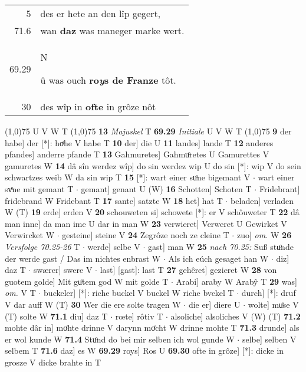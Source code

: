 \documentclass[8pt,a4paper,notitlepage]{article}
\begin{document}
\begin{table}[ht]
\begin{minipage}[t]{0.5\linewidth}
\begin{tabular}{rl}
5 & des er hete an den lîp gegert,\\ 
71.6 & wan \textbf{daz} was maneger marke wert.\\ 
69.29 & \begin{large}N\end{large}û was ouch \textbf{ro\textit{y}s de Franze} tôt.\\ 
30 & des wîp in \textbf{ofte} in grôze nôt\\ 
\end{tabular}
\scriptsize
\line(1,0){75} \newline
U V W T \newline
\line(1,0){75} \newline
\textbf{13} \textit{Majuskel} T  \textbf{69.29} \textit{Initiale} U V W T  \newline
\line(1,0){75} \newline
\textbf{9} der habe] der [*]: hoͤhe V habe T \textbf{10} der] die U \textbf{11} landes] lande T \textbf{12} anderes pfandes] anderre pfande T \textbf{13} Gahmuretes] Gahmuͦretes U Gamurettes V gamuretes W \textbf{14} dâ sîn werdez wîp] do sin werdez wip U do sin [*]: wip V do sein schwartzes weib W da sin wip T \textbf{15} [*]: wart einer suͦne bigemant V  $\cdot$ wart einer svͦne mit gemant T  $\cdot$ gemant] genant U (W) \textbf{16} Schotten] Schoten T  $\cdot$ Fridebrant] fridebrand W Fridebant T \textbf{17} sante] satzte W \textbf{18} het] hat T  $\cdot$ beladen] verladen W (T) \textbf{19} erde] erden V \textbf{20} schouweten si] schowete [*]: er V schôuweter T \textbf{22} dâ man inne] da man ime U dar in man W \textbf{23} verwieret] Verweret U Gewirket V Verwircket W  $\cdot$ gesteine] steine V \textbf{24} Zegrôze noch ze cleine T  $\cdot$ zuo] \textit{om.} W \textbf{26} \textit{Versfolge 70.25-26} T   $\cdot$ werde] selbe V  $\cdot$ gast] man W \textbf{25} \textit{nach 70.25:} Suß stuͦnde der werde gast / Das im nichtes enbrast W   $\cdot$ Als ich eúch gesaget han W  $\cdot$ diz] daz T  $\cdot$ swærer] swere V  $\cdot$ last] [gast]: last T \textbf{27} gehêret] gezieret W \textbf{28} von guotem golde] Mit guͦtem god W mit golde T  $\cdot$ Arabi] araby W Arabŷ T \textbf{29} was] \textit{om.} V T  $\cdot$ buckeler] [*]: riche buckel V buckel W riche bvckel T  $\cdot$ durch] [*]: druf V dar auff W (T) \textbf{30} Wer die ere solte tragen W  $\cdot$ die er] diere U  $\cdot$ wolte] muͤse V (T) solte W \textbf{71.1} diu] daz T  $\cdot$ rœte] rôtiv T  $\cdot$ alsoliche] alsoliches V (W) (T) \textbf{71.2} mohte dâr in] moͤhte drinne V darynn moͤcht W drinne mohte T \textbf{71.3} drunde] als er wol kunde W \textbf{71.4} Stuͦnd do bei mir selben ich wol gunde W  $\cdot$ selbe] selben V selbem T \textbf{71.6} daz] es W \textbf{69.29} roys] Ros U \textbf{69.30} ofte in grôze] [*]: dicke in grosze V dicke brahte in T \newline
\end{minipage}
\end{table}
\end{document}
